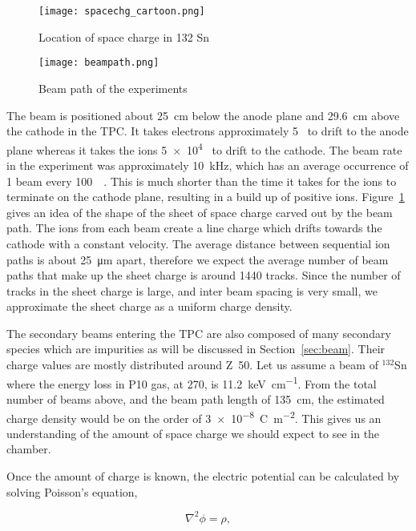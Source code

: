 \begin{figure}[!htb]
\centering
\texttt{[image: spacechg\_cartoon.png]}
\caption{Location of space charge in 132 Sn}
\label{fig:spacechg_cartoon}
\end{figure}


\begin{figure}[!htb]
\centering
\texttt{[image: beampath.png]}
\caption{Beam path of the experiments}
\label{fig:beampaths}
\end{figure}
 
 
 The beam is positioned about \SI{25}{\centi\metre} below the anode plane and \SI{29.6}{\centi\metre} above the cathode in the TPC. It takes electrons approximately 5\si{\micro\sec} to drift to the anode plane whereas it takes the ions \num{5e4}\si{\micro\sec} to drift to the cathode. The beam rate in the experiment was approximately \SI{10}{\kilo\hertz}, which has an average occurrence of 1 beam every \SI{100}{\micro\sec}. This is  much shorter than the time it takes for the ions to terminate on the cathode plane, resulting in a build up of positive ions. Figure~\ref{fig:spacechg_cartoon} gives an idea of the shape of the sheet of space charge carved out by the beam path. The ions from each beam create a line charge which drifts towards the cathode with a constant velocity. The average distance between sequential ion paths is about \SI{25}{\micro\metre} apart, therefore we expect the average number of beam paths that make up the sheet charge is around \num{1440} tracks. Since the number of tracks in the sheet charge is large, and inter beam spacing is very small, we approximate the sheet charge as a uniform charge density. 
 
 The secondary beams entering the TPC are also composed of many secondary species which are impurities as will be discussed in Section~\ref{sec:beam}. Their charge values are mostly distributed around Z~50. Let us assume a beam of ${}^{132}$Sn where the energy loss in P10 gas, at \SI{270}{\MeVA}, is \SI{11.2}{\kilo\electronvolt\per\centi\metre}. From the total number of beams above, and the beam path length of \SI{135}{\centi\metre}, the estimated charge density would be on the order of \SI{3e-8}{\coulomb\per\metre\squared}. This gives us an understanding of the amount of space charge we should expect to see in the chamber. 
 

Once the amount of charge is known, the electric potential can be calculated by solving Poisson's equation, 

\begin{equation}
\nabla^2 \phi = \rho,
\end{equation}

